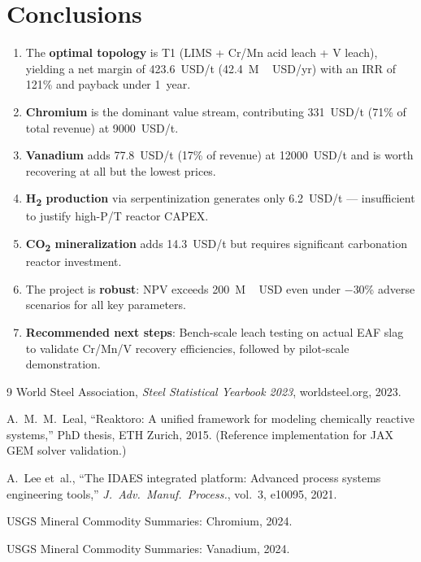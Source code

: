 \documentclass[11pt,a4paper]{article}
\begin{document}
\section{Conclusions}

\begin{enumerate}
\item The \textbf{optimal topology} is T1 (LIMS + Cr/Mn acid leach + V leach),
      yielding a net margin of \SI{423.6}{USD/t} (\SI{42.4}{M\,USD/yr}) with
      an IRR of 121\% and payback under 1~year.
\item \textbf{Chromium} is the dominant value stream, contributing
      \SI{331}{USD/t} (71\% of total revenue) at \SI{9000}{USD/t}.
\item \textbf{Vanadium} adds \SI{77.8}{USD/t} (17\% of revenue) at
      \SI{12000}{USD/t} and is worth recovering at all but the lowest prices.
\item \textbf{H\textsubscript{2} production} via serpentinization generates
      only \SI{6.2}{USD/t} --- insufficient to justify high-P/T reactor CAPEX.
\item \textbf{CO\textsubscript{2} mineralization} adds \SI{14.3}{USD/t} but
      requires significant carbonation reactor investment.
\item The project is \textbf{robust}: NPV exceeds \SI{200}{M\,USD} even under
      $-$30\% adverse scenarios for all key parameters.
\item \textbf{Recommended next steps}: Bench-scale leach testing on actual EAF
      slag to validate Cr/Mn/V recovery efficiencies, followed by pilot-scale
      demonstration.
\end{enumerate}


\begin{thebibliography}{9}
World Steel Association,
\textit{Steel Statistical Yearbook 2023},
worldsteel.org, 2023.

A.~M.~M.~Leal,
``Reaktoro: A unified framework for modeling chemically reactive systems,''
PhD thesis, ETH Zurich, 2015.
(Reference implementation for JAX GEM solver validation.)

A.~Lee et~al.,
``The IDAES integrated platform: Advanced process systems engineering tools,''
\textit{J.\ Adv.\ Manuf.\ Process.}, vol.~3, e10095, 2021.

USGS Mineral Commodity Summaries: Chromium, 2024.

USGS Mineral Commodity Summaries: Vanadium, 2024.
\end{thebibliography}
\end{document}
